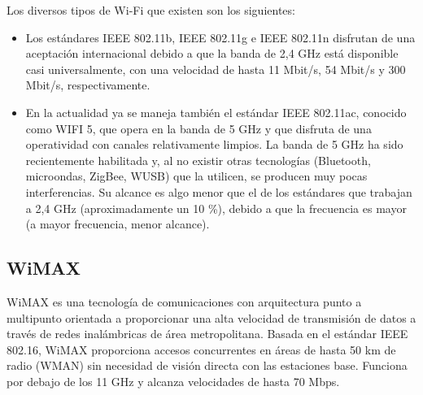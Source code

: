 		Los diversos tipos de Wi-Fi que existen  son los siguientes:
		\begin{itemize}
			\item Los estándares IEEE 802.11b, IEEE 802.11g e IEEE 802.11n disfrutan de una aceptación internacional debido a que la banda de 2,4 GHz está disponible casi universalmente, con una velocidad de hasta 11 Mbit/s, 54 Mbit/s y 300 Mbit/s, respectivamente.
			\item En la actualidad ya se maneja también el estándar IEEE 802.11ac, conocido como WIFI 5, que opera en la banda de 5 GHz y que disfruta de una operatividad con canales relativamente limpios. La banda de 5 GHz ha sido recientemente habilitada y, al no existir otras tecnologías (Bluetooth, microondas, ZigBee, WUSB) que la utilicen, se producen muy pocas interferencias. Su alcance es algo menor que el de los estándares que trabajan a 2,4 GHz (aproximadamente un 10 \%), debido a que la frecuencia es mayor (a mayor frecuencia, menor alcance).
		\end{itemize}
	
		
		\subsection{WiMAX}
		WiMAX es una tecnología de comunicaciones con arquitectura punto a multipunto orientada a proporcionar una alta velocidad de transmisión de datos a través de redes inalámbricas de área metropolitana.  Basada en el estándar IEEE 802.16, WiMAX proporciona accesos concurrentes en áreas de hasta 50 km de radio (WMAN) sin necesidad de visión directa con las estaciones base. Funciona por debajo de los 11 GHz y alcanza velocidades de hasta 70 Mbps. \cite{camargo2009} \cite{salazarRedes}
		
		
	
	
		